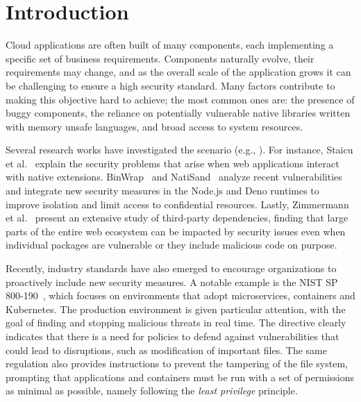 \section{Introduction}

Cloud applications are often built of many components, each
implementing a specific set of business requirements. Components
naturally evolve, their requirements may change, and as the overall scale
of the application grows it can be challenging to ensure a high
security standard. Many factors contribute to making this objective
hard to achieve; the most common ones are: the presence of buggy
components, the reliance on potentially vulnerable native libraries
written with memory unsafe languages, and broad access to system
resources.

Several research works have investigated the scenario (e.g.,
\cite{staicu2021bilingual, binwrap,natisand, zimmermann-risks}). For
instance, Staicu et al.~\cite{staicu2021bilingual} explain the
security problems that arise when web applications interact with
native extensions. BinWrap~\cite{binwrap} and NatiSand~\cite{natisand}
analyze recent vulnerabilities and integrate new security
measures in the Node.js and Deno runtimes to improve isolation and
limit access to confidential resources. Lastly, 
Zimmermann et al.~\cite{zimmermann-risks} present an extensive study of third-party
dependencies, finding that large parts of the entire web ecosystem can
be impacted by security issues even when individual packages are
vulnerable or they include malicious code on purpose.

Recently, industry standards have also emerged to encourage
organizations to proactively include new security measures. A notable
example is the NIST SP 800-190~\cite{nist-sp800-190}, which focuses on
environments that adopt microservices, containers and Kubernetes. The
production environment is given particular attention, with the goal of
finding and stopping malicious threats in real time.  The directive
clearly indicates that there is a need for policies to defend against
vulnerabilities that could lead to disruptions, such as modification
of important files. The same regulation also provides instructions to
prevent the tampering of the file system, prompting that applications
and containers must be run with a set of permissions as minimal as
possible, namely following the {\em least privilege} principle.


